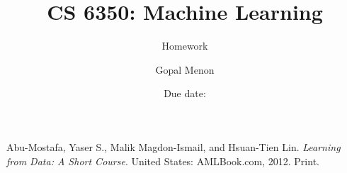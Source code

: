 \documentclass[12pt, fullpage,letterpaper]{article}
\title{CS 6350: Machine Learning \semester}
\author{Homework \assignmentId}
\author{Gopal Menon}
\date{Due date: \dueDate}
\begin{document}
\maketitle













\begin{thebibliography}{1}
Abu-Mostafa, Yaser S., Malik Magdon-Ismail, and Hsuan-Tien Lin. \textit{Learning from Data: A Short Course}. United States: AMLBook.com, 2012. Print.

\end{thebibliography}
\end{document}
